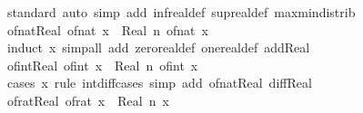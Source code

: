 \begin{isabellebody}
\ standard\ {\isacharparenleft}{\kern0pt}auto\ simp\ add{\isacharcolon}{\kern0pt}\ inf{\isacharunderscore}{\kern0pt}real{\isacharunderscore}{\kern0pt}def\ sup{\isacharunderscore}{\kern0pt}real{\isacharunderscore}{\kern0pt}def\ max{\isacharunderscore}{\kern0pt}min{\isacharunderscore}{\kern0pt}distrib{}{\isacharparenright}{\kern0pt}%
\endisatagproof
{\isafoldproof}%
%
\isadelimproof
\isanewline
%
\endisadelimproof
\isanewline
{}\isamarkupfalse%
\isanewline
\isanewline
{}\isamarkupfalse%
\ of{\isacharunderscore}{\kern0pt}nat{\isacharunderscore}{\kern0pt}Real{\isacharcolon}{\kern0pt}\ {\isachardoublequoteopen}of{\isacharunderscore}{\kern0pt}nat\ x\ {\isacharequal}{\kern0pt}\ Real\ {\isacharparenleft}{\kern0pt}{\isasymlambda}n{\isachardot}{\kern0pt}\ of{\isacharunderscore}{\kern0pt}nat\ x{\isacharparenright}{\kern0pt}{\isachardoublequoteclose}\isanewline
%
\isadelimproof
\ \ %
\endisadelimproof
%
\isatagproof
{}\isamarkupfalse%
\ {\isacharparenleft}{\kern0pt}induct\ x{\isacharparenright}{\kern0pt}\ {\isacharparenleft}{\kern0pt}simp{\isacharunderscore}{\kern0pt}all\ add{\isacharcolon}{\kern0pt}\ zero{\isacharunderscore}{\kern0pt}real{\isacharunderscore}{\kern0pt}def\ one{\isacharunderscore}{\kern0pt}real{\isacharunderscore}{\kern0pt}def\ add{\isacharunderscore}{\kern0pt}Real{\isacharparenright}{\kern0pt}%
\endisatagproof
{\isafoldproof}%
%
\isadelimproof
\isanewline
%
\endisadelimproof
\isanewline
{}\isamarkupfalse%
\ of{\isacharunderscore}{\kern0pt}int{\isacharunderscore}{\kern0pt}Real{\isacharcolon}{\kern0pt}\ {\isachardoublequoteopen}of{\isacharunderscore}{\kern0pt}int\ x\ {\isacharequal}{\kern0pt}\ Real\ {\isacharparenleft}{\kern0pt}{\isasymlambda}n{\isachardot}{\kern0pt}\ of{\isacharunderscore}{\kern0pt}int\ x{\isacharparenright}{\kern0pt}{\isachardoublequoteclose}\isanewline
%
\isadelimproof
\ \ %
\endisadelimproof
%
\isatagproof
{}\isamarkupfalse%
\ {\isacharparenleft}{\kern0pt}cases\ x\ rule{\isacharcolon}{\kern0pt}\ int{\isacharunderscore}{\kern0pt}diff{\isacharunderscore}{\kern0pt}cases{\isacharparenright}{\kern0pt}\ {\isacharparenleft}{\kern0pt}simp\ add{\isacharcolon}{\kern0pt}\ of{\isacharunderscore}{\kern0pt}nat{\isacharunderscore}{\kern0pt}Real\ diff{\isacharunderscore}{\kern0pt}Real{\isacharparenright}{\kern0pt}%
\endisatagproof
{\isafoldproof}%
%
\isadelimproof
\isanewline
%
\endisadelimproof
\isanewline
{}\isamarkupfalse%
\ of{\isacharunderscore}{\kern0pt}rat{\isacharunderscore}{\kern0pt}Real{\isacharcolon}{\kern0pt}\ {\isachardoublequoteopen}of{\isacharunderscore}{\kern0pt}rat\ x\ {\isacharequal}{\kern0pt}\ Real\ {\isacharparenleft}{\kern0pt}{\isasymlambda}n{\isachardot}{\kern0pt}\ x{\isacharparenright}{\kern0pt}{\isachardoublequoteclose}\isanewline

\end{isabellebody}
